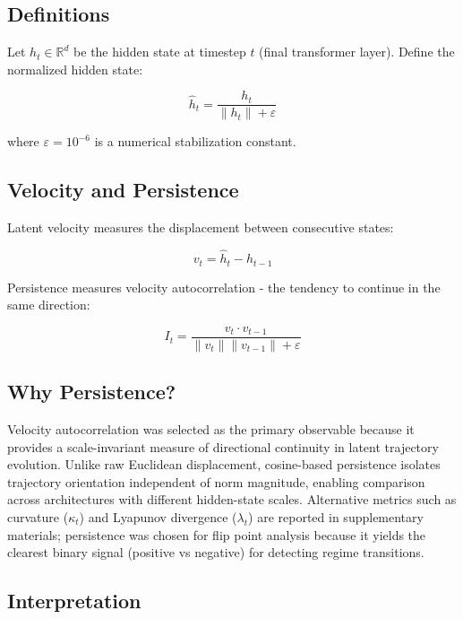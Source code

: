 \documentclass[12pt,a4paper]{article}
\begin{document}
\subsection{Definitions}

Let $h_t \in \mathbb{R}^d$ be the hidden state at timestep $t$ (final transformer layer). Define the normalized hidden state:

\begin{equation}
\hat{h}_t = \frac{h_t}{\|h_t\| + \varepsilon}
\end{equation}

where $\varepsilon = 10^{-6}$ is a numerical stabilization constant.

\subsection{Velocity and Persistence}

Latent velocity measures the displacement between consecutive states:

\begin{equation}
v_t = \hat{h}_t - \hat{h}_{t-1}
\end{equation}

Persistence measures velocity autocorrelation - the tendency to continue in the same direction:

\begin{equation}
I_t = \frac{v_t \cdot v_{t-1}}{\|v_t\| \|v_{t-1}\| + \varepsilon}
\end{equation}

\subsection{Why Persistence?}

Velocity autocorrelation was selected as the primary observable because it provides a scale-invariant measure of directional continuity in latent trajectory evolution. Unlike raw Euclidean displacement, cosine-based persistence isolates trajectory orientation independent of norm magnitude, enabling comparison across architectures with different hidden-state scales. Alternative metrics such as curvature ($\kappa_t$) and Lyapunov divergence ($\lambda_t$) are reported in supplementary materials; persistence was chosen for flip point analysis because it yields the clearest binary signal (positive vs negative) for detecting regime transitions.

\subsection{Interpretation}
\end{document}
